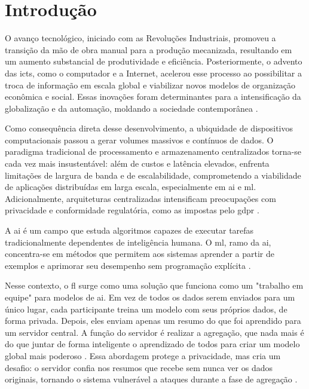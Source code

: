 \chapter{Introdução}
\label{cap:introducao}

O avanço tecnológico, iniciado com as Revoluções Industriais, promoveu a transição da mão de obra manual para a produção mecanizada, resultando em um aumento substancial de produtividade e eficiência. Posteriormente, o advento das \glspl{ict}, como o computador e a Internet, acelerou esse processo ao possibilitar a troca de informação em escala global e viabilizar novos modelos de organização econômica e social. Essas inovações foram determinantes para a intensificação da globalização e da automação, moldando a sociedade contemporânea \cite{Moshawrab2023}. 

Como consequência direta desse desenvolvimento, a ubiquidade de dispositivos computacionais passou a gerar volumes massivos e contínuos de dados. O paradigma tradicional de processamento e armazenamento centralizados torna-se cada vez mais insustentável: além de custos e latência elevados, enfrenta limitações de largura de banda e de escalabilidade, comprometendo a viabilidade de aplicações distribuídas em larga escala, especialmente em \gls{ai} e \gls{ml}. Adicionalmente, arquiteturas centralizadas intensificam preocupações com privacidade e conformidade regulatória, como as impostas pelo \gls{gdpr} \cite{Sikandar2023}.

A \gls{ai} é um campo que estuda algoritmos capazes de executar tarefas tradicionalmente dependentes de inteligência humana. O \gls{ml}, ramo da \gls{ai}, concentra-se em métodos que permitem aos sistemas aprender a partir de exemplos e aprimorar seu desempenho sem programação explícita \cite{Moshawrab2023}.

Nesse contexto, o \gls{fl} surge como uma solução que funciona como um "trabalho em equipe" para modelos de \gls{ai}. Em vez de todos os dados serem enviados para um único lugar, cada participante treina um modelo com seus próprios dados, de forma privada. Depois, eles enviam apenas um resumo do que foi aprendido para um servidor central. A função do servidor é realizar a agregação, que nada mais é do que juntar de forma inteligente o aprendizado de todos para criar um modelo global mais poderoso \cite{Yang2019}. Essa abordagem protege a privacidade, mas cria um desafio: o servidor confia nos resumos que recebe sem nunca ver os dados originais, tornando o sistema vulnerável a ataques durante a fase de agregação \cite{Kairouz2021}.

